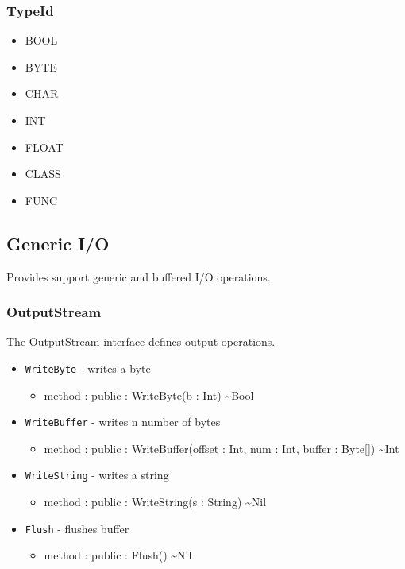 \documentclass[11pt]{article}
\begin{document}
\subsubsection{TypeId}
 \begin{itemize}
 \item BOOL
 \item BYTE
 \item CHAR
 \item INT
 \item FLOAT
 \item CLASS
 \item FUNC
 \end{itemize}

\subsection{Generic I/O}
Provides support generic and buffered I/O operations.  

\subsubsection{OutputStream}
The OutputStream interface defines output operations.
\begin{itemize}
\item \texttt{WriteByte} - writes a byte
  \begin{itemize}
  \item method : public : WriteByte(b : Int) \textasciitilde Bool
  \end{itemize}
\item \texttt{WriteBuffer} - writes n number of bytes
  \begin{itemize}
  \item method : public : WriteBuffer(offset : Int, num : Int, buffer
    : Byte[]) \textasciitilde Int
  \end{itemize}
\item \texttt{WriteString} - writes a string
  \begin{itemize}
  \item method : public : WriteString(s : String) \textasciitilde Nil
  \end{itemize}
\item \texttt{Flush} - flushes buffer
  \begin{itemize}
  \item method : public : Flush() \textasciitilde Nil
  \end{itemize}
\end{itemize}
\end{document}
